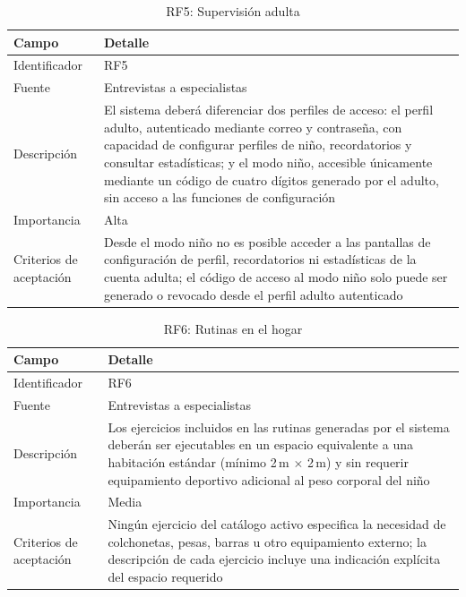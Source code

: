 					\begin{table}[H]
						\centering\small
						\caption{RF5: Supervisión adulta}
						\label{tab:rf5}
						\begin{tabular}{p{3.5cm}p{11cm}}
							\hline
							\textbf{Campo} & \textbf{Detalle} \\
							\hline
							Identificador & RF5 \\
							
							Fuente & Entrevistas a especialistas \\
							
							Descripción & El sistema deberá diferenciar dos perfiles de acceso: el perfil adulto, autenticado mediante correo y contraseña, con capacidad de configurar perfiles de niño, recordatorios y consultar estadísticas; y el modo niño, accesible únicamente mediante un código de cuatro dígitos generado por el adulto, sin acceso a las funciones de configuración \\
							
							Importancia & Alta \\
							
							Criterios de aceptación & Desde el modo niño no es posible acceder a las pantallas de configuración de perfil, recordatorios ni estadísticas de la cuenta adulta; el código de acceso al modo niño solo puede ser generado o revocado desde el perfil adulto autenticado \\
							\hline
						\end{tabular}
					\end{table} \tblnote
					
					\begin{table}[H]
						\centering\small
						\caption{RF6: Rutinas en el hogar}
						\label{tab:rf6}
						\begin{tabular}{p{3.5cm}p{11cm}}
							\hline
							\textbf{Campo} & \textbf{Detalle} \\
							\hline
							Identificador & RF6 \\
							
							Fuente & Entrevistas a especialistas \\
							
							Descripción & Los ejercicios incluidos en las rutinas generadas por el sistema deberán ser ejecutables en un espacio equivalente a una habitación estándar (mínimo 2\,m $\times$ 2\,m) y sin requerir equipamiento deportivo adicional al peso corporal del niño \\
							
							Importancia & Media \\
							
							Criterios de aceptación & Ningún ejercicio del catálogo activo especifica la necesidad de colchonetas, pesas, barras u otro equipamiento externo; la descripción de cada ejercicio incluye una indicación explícita del espacio requerido \\
							\hline
						\end{tabular}
					\end{table} \tblnote
					
